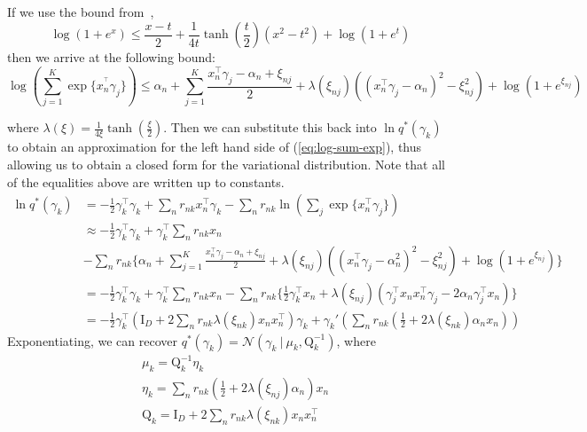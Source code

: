 \documentclass[twoside,11pt]{article}
\newcommand{\tr}{\intercal}
\newcommand{\eye}{\mathrm{I}}
\newcommand\given[1][]{\:#1\vert\:}
\begin{document}
If we use the bound from~\cite{jj:2001}, $$\log(1 + e^x) \leq \frac{x - t}{2} + \frac{1}{4t} \tanh \left( \frac{t}{2} \right) (x^2 - t^2) + \log\left(1 + e^t\right)$$ then we arrive at the following bound: 
\begin{equation} \label{eq:jj_bound}
	\log \left( \sum_{j = 1}^K \exp\{ x_n^{^\intercal} \gamma_j \}\right) \leq 
\alpha_n + \sum_{j = 1}^K \frac{x_n^{\intercal} \gamma_j - \alpha_n + \xi_{nj}}{2} + \lambda(\xi_{nj}) \left( (x_n^{\intercal} \gamma_j - \alpha_n)^2 - \xi_{nj}^2\right) + \log \left( 1 + e^{\xi_{nj}}\right)
\end{equation}

where $\lambda(\xi) = \frac{1}{4\xi} \tanh \left( \frac{\xi}{2} \right)$. Then we can substitute this back into $\ln q^{*}(\gamma_k)$ to obtain an approximation for the left hand side of (\ref{eq:log-sum-exp}), thus allowing us to obtain a closed form for the variational distribution. Note that all of the equalities above are written up to constants.
\begin{align*}
    \ln q^{*}(\gamma_k) &= - \frac{1}{2} \gamma_k^{\tr} \gamma_k + \sum_{n} r_{nk} x_n^{\intercal} \gamma_k  - \sum_n r_{nk} \ln \left( \sum_j \exp\{x_n^{\intercal} \gamma_j \} \right)  \\
    & \approx - \frac{1}{2} \gamma_k^{\tr} \gamma_k + \gamma_k^{\intercal} \sum_{n} r_{nk} x_n \\
    & - \sum_n r_{nk} \Bigg\{ \alpha_n + \sum_{j = 1}^K \frac{x_n^{\intercal} \gamma_j - \alpha_n + \xi_{nj}}{2} + \lambda(\xi_{nj}) \left( (x_n^{\intercal} \gamma_j - \alpha_n^2)^2 - \xi_{nj}^2\right) + \log \left( 1 + e^{\xi_{nj}}\right) \Bigg\} \\
    & = - \frac{1}{2} \gamma_k^{\tr} \gamma_k + \gamma_k^{\intercal} \sum_{n} r_{nk} x_n - \sum_n r_{nk} \Bigg\{ \frac{1}{2} \gamma_k^{\tr} x_n + \lambda\left( \xi_{nj} \right) \left( \gamma_j^{\tr}x_n x_n^{\tr} \gamma_j - 2\alpha_n \gamma_j^{\tr} x_n \right)\Bigg\} \\
    &= -\frac{1}{2} \gamma_k^{\tr} \left(\eye_D  + 2 \sum_n r_{nk} \lambda(\xi_{nk}) x_n x_n^{\tr} \right) \gamma_k + \gamma_k' \left( \sum_n r_{nk} \left(\frac{1}{2} + 2 \lambda \left( \xi_{nk}\right) \alpha_n  x_n\right) \right)
\end{align*}
Exponentiating, we can recover $q^{*}(\gamma_k) = \mathcal{N} \left(\gamma_k \given \mu_k, \mathrm{Q}_k^{-1} \right)$, where
\begin{equation} \label{eq:gamma_params}
\begin{split}
	& \mu_k = \mathrm{Q}_k^{-1} \eta_k \\
	& \eta_k = \sum_{n} r_{nk} \left( \frac{1}{2} + 2 \lambda(\xi_{nj}) \alpha_n \right) x_n \\
	& \mathrm{Q}_k = \eye_D + 2 \sum_{n} r_{nk} \lambda(\xi_{nk}) x_n x_n^{\tr}
\end{split}
\end{equation}
\end{document}
